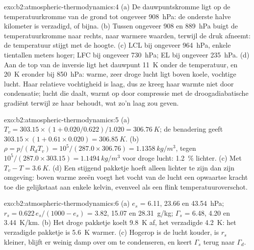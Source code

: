 \begin{solution}{exo:b2:atmospheric-thermodynamics:4}
(a) De dauwpuntskromme ligt op de temperatuurkromme van de grond tot ongeveer \qty{908}{hPa}:
de onderste halve kilometer is verzadigd, of bijna. (b) Tussen ongeveer 908 en \qty{889}{hPa}
buigt de temperatuurkromme naar rechts, naar warmere waarden, terwijl de druk afneemt: de
temperatuur stijgt met de hoogte. (c) LCL bij ongeveer \qty{964}{hPa}, enkele tientallen meters hoger; LFC bij
ongeveer \qty{730}{hPa}; EL bij ongeveer \qty{235}{hPa}. (d) Aan de top van de inversie ligt het dauwpunt
\qty{11}{K} onder de temperatuur, en \qty{20}{K} eronder bij \qty{850}{hPa}: warme, zeer droge
lucht ligt boven koele, vochtige lucht. Haar relatieve vochtigheid is laag, dus ze kreeg haar
warmte niet door condensatie; lucht die daalt, warmt op door compressie met de droogadiabatische gradiënt terwijl
ze haar  behoudt, wat zo'n laag zou geven.
\end{solution}

\begin{solution}{exo:b2:atmospheric-thermodynamics:5}
(a) $T_v = 303.15 \times (1 + 0.020/0.622)/1.020 = \qty{306.76}{K}$; de benadering geeft
$303.15 \times (1 + 0.61 \times 0.020) = \qty{306.85}{K}$. (b) $\rho = p/(R_dT_v) = 10^5/(287.0
\times 306.76) = \qty{1.1358}{kg/m^3}$, tegen $10^5/(287.0 \times 303.15) =
\qty{1.1494}{kg/m^3}$ voor droge lucht: \qty{1.2}{\percent} lichter. (c) Met $T_v - T =
\qty{3.6}{K}$. (d) Een stijgend pakketje hoeft alleen lichter te zijn dan zijn omgeving: boven warme zeeën
voegt het vocht van de lucht een opwaartse kracht toe die gelijkstaat aan enkele kelvin, evenveel als een flink
temperatuuroverschot.
\end{solution}

\begin{solution}{exo:b2:atmospheric-thermodynamics:6}
(a) $e_s$ = 6.11, 23.66 en \qty{43.54}{hPa}; $r_s = 0.622\,e_s/(1000 - e_s)$ = 3.82, 15.07 en
\qty{28.31}{g/kg}; $\Gamma_s$ = 6.48, 4.20 en \qty{3.44}{K/km}. (b) Het droge pakketje koelt
\qty{9.8}{K} af, het verzadigde \qty{4.2}{K}: het verzadigde pakketje is \qty{5.6}{K} warmer.
(c) Hogerop is de lucht kouder, is $r_s$ kleiner, blijft er weinig damp over om te condenseren, en
keert $\Gamma_s$ terug naar $\Gamma_d$.
\end{solution}

